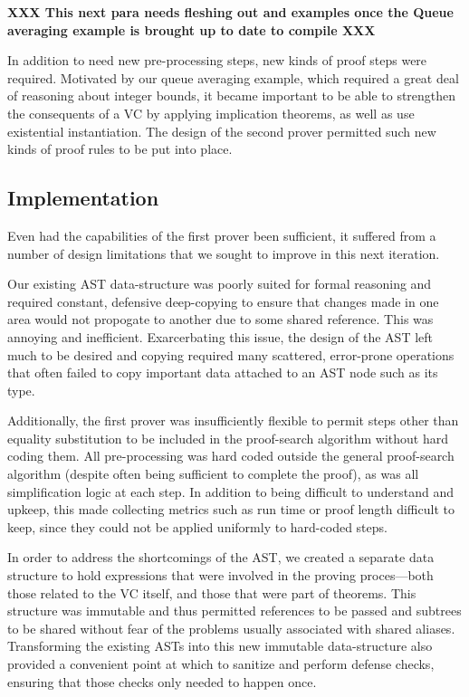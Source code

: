 \textbf{XXX This next para needs fleshing out and examples once the Queue averaging example is brought up to date to compile XXX}

In addition to need new pre-processing steps, new kinds of proof steps were required.  Motivated by our queue averaging example, which required a great deal of reasoning about integer bounds, it became important to be able to strengthen the consequents of a VC by applying implication theorems, as well as use existential instantiation.  The design of the second prover permitted such new kinds of proof rules to be put into place.

	\subsection{Implementation}

Even had the capabilities of the first prover been sufficient, it suffered from a number of design limitations that we sought to improve in this next iteration.

Our existing AST data-structure was poorly suited for formal reasoning and required constant, defensive deep-copying to ensure that changes made in one area would not propogate to another due to some shared reference.  This was annoying and inefficient.  Exarcerbating this issue, the design of the AST left much to be desired and copying required many scattered, error-prone operations that often failed to copy important data attached to an AST node such as its type.

Additionally, the first prover was insufficiently flexible to permit steps other than equality substitution to be included in the proof-search algorithm without hard coding them.  All pre-processing was hard coded outside the general proof-search algorithm (despite often being sufficient to complete the proof), as was all simplification logic at each step.  In addition to being difficult to understand and upkeep, this made collecting metrics such as run time or proof length difficult to keep, since they could not be applied uniformly to hard-coded steps.

In order to address the shortcomings of the AST, we created a separate data structure to hold expressions that were involved in the proving proces---both those related to the VC itself, and those that were part of theorems.  This structure was immutable and thus permitted references to be passed and subtrees to be shared without fear of the problems usually associated with shared aliases.  Transforming the existing ASTs into this new immutable data-structure also provided a convenient point at which to sanitize and perform defense checks, ensuring that those checks only needed to happen once.

